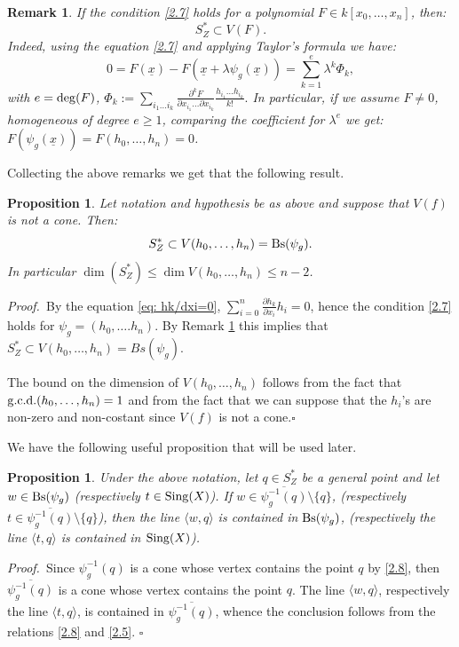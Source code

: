 \documentclass[11pt,a4paper]{amsart}
\newtheorem{rem}[theorem]{Remark}
\newtheorem{prop}[theorem]{Proposition}
\newcommand{\bprf}{{\it Proof.~}}
\newcommand{\eprf}{\hfill $\square$ \bigskip\par}
\begin{document}
\begin{rem}\label{rem3}{\em
If the condition \eqref{2.7} holds for a polynomial $F\in
k[x_0,\ldots ,x_n]$, then:
$$S_Z^*\subset V(F).$$
Indeed, using the equation \eqref{2.7} and applying Taylor's formula we have:
$$0= F(\underline{x})-F(\underline{x}+\lambda\psi_g(\underline{x}))=\sum_{k=1}^e\lambda ^k\Phi_k,$$
with $e={\rm deg}(F)$, $\Phi_k:=\sum_{i_1\ldots i_k}\frac{\partial
^kF}{\partial x_{i_1}\ldots \partial x_{i_k}}\frac{h_{i_1}\ldots
h_{i_k}}{k!}.$ In particular, if we assume $F\neq 0$, homogeneous
of degree $e\geq 1$, comparing the coefficient for $\lambda ^e$ we
get: $F(\psi_g (\underline{x}))=F(h_0,\ldots,h_n)=0$. }\end{rem}

Collecting the above remarks we get  that the following result.
\begin{prop}\label{prop: GN dimension of S dual}
{Let notation and hypothesis be as above and suppose that $V(f)$ is not a cone. Then}:
$$S^*_Z \subset V(h_0,\ldots ,h_n)={\rm Bs}(\psi_g).$$
In particular $\dim (S^*_Z)\leq \dim V(h_0,\ldots,h_n)\leq n-2$.
\end{prop}
\bprf By the equation \eqref{eq: hk/dxi=0},
$\sum_{i=0}^n\frac{\partial h_k}{\partial x_i}h_i=0$, hence the
condition \eqref{2.7} holds for $\psi_g=(h_0,\ldots. h_n)$. By
Remark \ref{rem3} this implies that $S_Z^*\subset V(h_0,\ldots,
h_n)=Bs(\psi_g)$.

The bound on the dimension of $V(h_0,\ldots, h_n)$ follows from
the fact that ${\rm g.c.d.}(h_0, \ldots, h_n)=1$ and from the fact
that we can suppose that the $h_i$'s are non-zero and non-costant
since $V(f)$ is not a cone.\eprf

We have the following useful proposition that will be used later.
\begin{prop}\label{prop: GN lines in base locus}
Under the above notation, let $q\in S^*_Z$ be a general point and
let $w\in{\rm Bs}(\psi_g)$ (respectively $t\in {\rm Sing}(X)$). If
$w\in \overline{\psi_g^{-1}(q)}\setminus\{q\}$, (respectively
$t\in \overline{\psi_g^{-1}(q)}\setminus\{q\}$), then the line
$\langle w,q\rangle$ is contained in ${\rm Bs}(\psi_g)$,
(respectively the line $\langle t,q\rangle$ is contained in ${\rm
Sing}(X)$).
\end{prop}
\bprf Since $\psi_g ^{-1}(q)$ is a cone whose vertex contains the point $q$ by \eqref{2.8}, then $\overline{\psi_g^{-1}(q)}$
is a cone whose vertex contains the point $q$. The line $\langle w,q\rangle$, respectively the line  $\langle t,q\rangle$, is contained in $ \overline{\psi_g^{-1}(q)}$, whence the conclusion follows from the relations \eqref{2.8} and \eqref{2.5}.
\eprf
\end{document}
